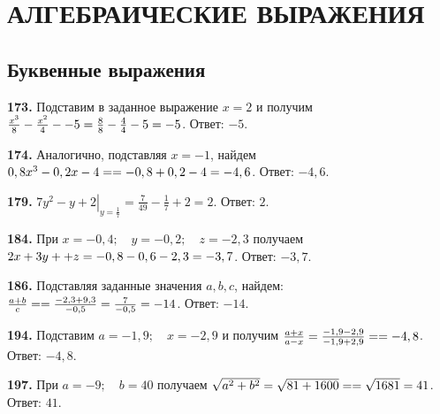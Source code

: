 \section{АЛГЕБРАИЧЕСКИЕ ВЫРАЖЕНИЯ}
\subsection{Буквенные выражения}


\textbf{173.} Подставим  в заданное выражение $x=2$ и получим $\frac{x^3}{8}-\frac{x^2}{4}-\linebreak-5=\frac{8}{8}-\frac{4}{4}-5=-5$. \newline \null \hspace*{\fill} Ответ: $-5$. 

\textbf{174.} Аналогично, подставляя $x=-1$, найдем $0,8x^3-0,2x-4=\linebreak=-0,8+0,2-4=-4,6$. \newline \null \hspace*{\fill} Ответ: $-4,6$. 

\textbf{179.} $\left.7y^2-y+2\right|_{y=\frac{1}{7}}=\frac{7}{49}-\frac{1}{7}+2=2$. \newline \null \hspace*{\fill} Ответ: $2$.

\textbf{184.} При $x=-0,4;\quad y=-0,2;\quad z=-2,3$ получаем $2x+3y+\linebreak+z=-0,8-0,6-2,3=-3,7$. \newline \null \hspace*{\fill} Ответ: $-3,7$.

\textbf{186.} Подставляя заданные значения $a, b,c$, найдем: $\frac{a+b}{c}=\linebreak= \frac{-2,3+9,3}{-0,5}= \frac{7}{-0,5}=-14$. \newline \null \hspace*{\fill} Ответ: $-14$. 

\textbf{194.} Подставим $a=-1,9;\quad x=-2,9$ и получим
$\frac{a+x}{a-x}=\frac{-1,9-2,9}{-1,9+2,9}=\linebreak=-4,8$. \newline \null \hspace*{\fill} Ответ: $-4,8$. 

\textbf{197.} При $a=-9;\quad b=40$ получаем $\sqrt{a^2+b^2}=\sqrt{81+1600}=\linebreak=\sqrt{1681}=41$.\newline \null \hspace*{\fill} Ответ: $41$. 

